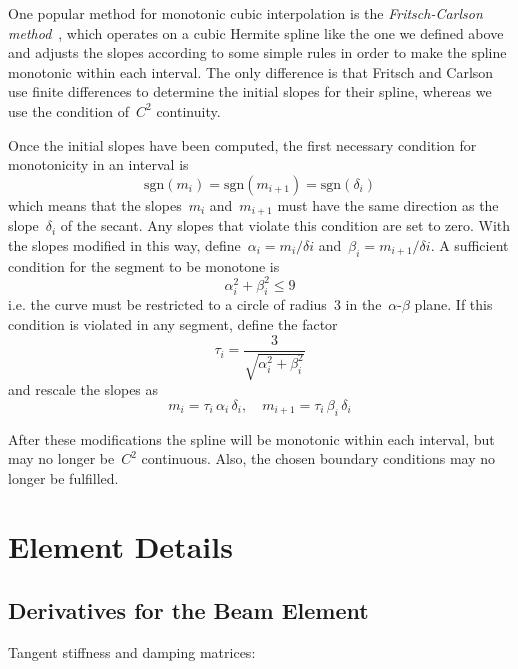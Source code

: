 One popular method for monotonic cubic interpolation is the \textit{Fritsch-Carlson method}~\cite{bib:fc80}, which operates on a cubic Hermite spline like the one we defined above and adjusts the slopes according to some simple rules in order to make the spline monotonic within each interval.
The only difference is that Fritsch and Carlson use finite differences to determine the initial slopes for their spline, whereas we use the condition of~$C^2$ continuity.

Once the initial slopes have been computed, the first necessary condition for monotonicity in an interval is
%
\begin{equation}
\mathrm{sgn}(m_{i}) = \mathrm{sgn}(m_{i+1}) = \mathrm{sgn}(\delta_{i})
\end{equation}
%
which means that the slopes~$m_{i}$ and~$m_{i+1}$ must have the same direction as the slope~$\delta_{i}$ of the secant.
Any slopes that violate this condition are set to zero.
With the slopes modified in this way, define~$\alpha_{i} = m_{i}/\delta{i}$ and~$\beta_{i} = m_{i+1}/\delta{i}$.
A sufficient condition for the segment to be monotone is
%
\begin{equation}
\alpha_{i}^2 + \beta_{i}^2 \le 9
\end{equation}
%
i.e. the curve must be restricted to a circle of radius~$3$ in the~$\alpha$-$\beta$ plane.
If this condition is violated in any segment, define the factor
%
\begin{equation}
\tau_{i} = \frac{3}{\sqrt{\alpha_{i}^2 + \beta_{i}^2}}
\end{equation}
%
and rescale the slopes as
%
\begin{equation}
m_{i} = \tau_{i}\,\alpha_{i}\,\delta_{i},\quad m_{i+1} = \tau_{i}\,\beta_{i}\,\delta_{i}
\end{equation}

After these modifications the spline will be monotonic within each interval, but may no longer be~$C^2$ continuous.
Also, the chosen boundary conditions may no longer be fulfilled.

\chapter{Element Details}
\section{Derivatives for the Beam Element}
\label{section:beam-element-stiffness-damping}

Tangent stiffness and damping matrices:

